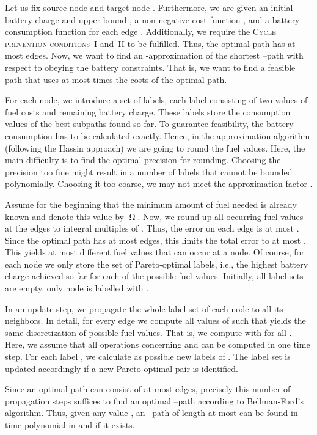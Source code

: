 \documentclass[a4paper]{scrartcl}
\newcommand{\OPT}{\ensuremath{\operatorname{\Omega}}}
\begin{document}
Let us fix source node  and target node . Furthermore, we are given an initial battery charge  and upper bound , a non-negative cost function , and a battery consumption function  for each edge . Additionally, we require the \textsc{Cycle prevention conditions~I} and~\textsc{II} to be fulfilled. Thus, the optimal path has at most  edges. Now, we want to find an -approximation of the shortest --path with respect to  obeying the battery constraints. That is, we want to find a feasible path that uses at most  times the costs of the optimal path. 

For each node, we introduce a set of labels, each label consisting of two values  of fuel costs and remaining battery charge. These labels store the consumption values of the best subpaths found so far. To guarantee feasibility, the battery consumption has to be calculated exactly. Hence, in the approximation algorithm (following the Hassin approach) we are going to round the fuel values. Here, the main difficulty is to find the optimal precision for rounding. Choosing the precision too fine might result in a number of labels that cannot be bounded polynomially. Choosing it too coarse, we may not meet the approximation factor . 

Assume for the beginning that the minimum amount of fuel needed is already known and denote this value by \OPT. Now, we round up all occurring fuel values at the edges to integral multiples of . Thus, the error on each edge is at most . Since the optimal path  has at most  edges, this limits the total error to at most . This yields at most  different fuel values that can occur at a node. Of course, for each node  we only store the set  of Pareto-optimal labels, i.e., the highest battery charge achieved so far for each of the possible fuel values. Initially, all label sets  are empty, only node  is labelled with . 

In an update step, we propagate the whole label set of each node to all its neighbors. In detail, for every edge  we compute all values of  such that  yields the same discretization of possible fuel values. That is, we compute  with  for all . Here, we assume that all operations concerning  and  can be computed in one time step. For each label , we calculate  as possible new labels of . The label set  is updated accordingly if a new Pareto-optimal pair  is identified. 

Since an optimal path can consist of at most  edges, precisely  this number of propagation steps suffices to find an optimal --path according to Bellman-Ford's algorithm. Thus, given any value , an --path of length at most  can be found in time polynomial in  and  if it exists.
\end{document}
